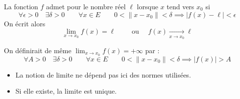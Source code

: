 \documentclass[12pt, class=report,crop=false]{standalone}
\begin{document}
\begin{definition}
La fonction $f$ admet pour  le nombre réel $\ell$ lorsque $x$ tend vers $x_0$ si 
$$\forall \epsilon >0 \quad \exists \delta > 0 \qquad
\forall x\in E  \qquad 
0< \| x-x_0 \| <\delta \implies | f(x)-\ell | < \epsilon
$$
On écrit alors 
$$\lim_{x \to x_0} f(x) = \ell \qquad \text{ ou } \quad f(x) \underset{x\to x_0}{\longrightarrow} \ell$$
\end{definition}

On définirait de même $\lim_{x \to x_0} f(x) = +\infty$ par :
$$\forall A >0 \quad \exists \delta > 0 \qquad
\forall x\in E  \qquad 
0< \| x-x_0 \| <\delta \implies | f(x) | > A
$$

\begin{remarque*}
\sauteligne
\begin{itemize}
\item La notion de limite ne dépend pas ici des normes utilisées.
\item Si elle existe, la limite est unique.
\end{itemize}
\end{remarque*}
\end{document}
